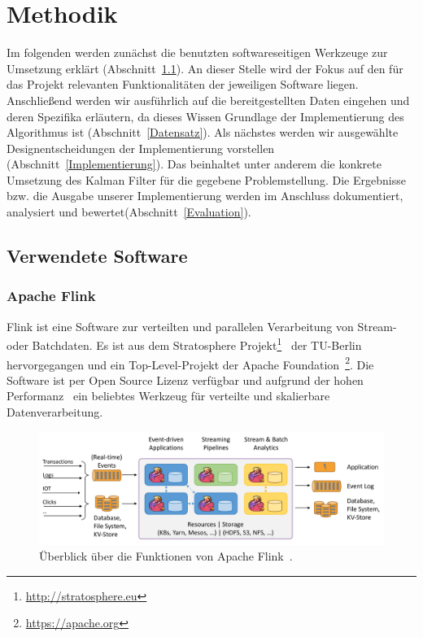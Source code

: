 \documentclass[11pt]{article}
\begin{document}
\section{Methodik}\label{Methodik}
Im folgenden werden zunächst die benutzten softwareseitigen Werk\-zeu\-ge zur Umsetzung erklärt (Abschnitt~\ref{Verwendete-Software}). An dieser Stelle wird der Fokus auf den für das Projekt relevanten Funktionalitäten der jeweiligen Software liegen. Anschließend werden wir ausführlich auf die bereitgestellten Daten eingehen und deren Spezifika erläutern, da dieses Wissen Grundlage der Implementierung des Algorithmus ist (Abschnitt~\ref{Datensatz}). Als nächstes werden wir ausgewählte Designentscheidungen der Implementierung vorstellen (Abschnitt~\ref{Implementierung}). Das beinhaltet unter anderem die konkrete Umsetzung des Kalman Filter für die gegebene Problemstellung. Die Ergebnisse bzw. die Ausgabe unserer Implementierung werden im Anschluss dokumentiert, analysiert und bewertet(Abschnitt~\ref{Evaluation}).

\subsection{Verwendete Software}\label{Verwendete-Software}
\subsubsection{Apache Flink}
Flink ist eine Software zur verteilten und parallelen Verarbeitung von Stream- oder Batch\-daten. Es ist aus dem Stratosphere Projekt\footnote{\url{http://stratosphere.eu}}~\cite{alexandrov_stratosphere_2014} der TU-Berlin hervorgegangen und ein Top-Level-Projekt der Apache Foundation~\footnote{\url{https://apache.org}}. Die Software ist per Open Source Lizenz verfügbar und aufgrund der hohen Performanz~\cite{alexandrov_stratosphere_2014} ein beliebtes Werkzeug für verteilte und skalierbare Datenverarbeitung.

\begin{figure}[!t]
	\centering
	\includegraphics[width=5in]{flink-home-graphic.png}
	\caption{Überblick über die Funktionen von Apache Flink~\cite{Flink-Overview-Link}.}
	\label{Flink-Überblick}
\end{figure}
\end{document}
